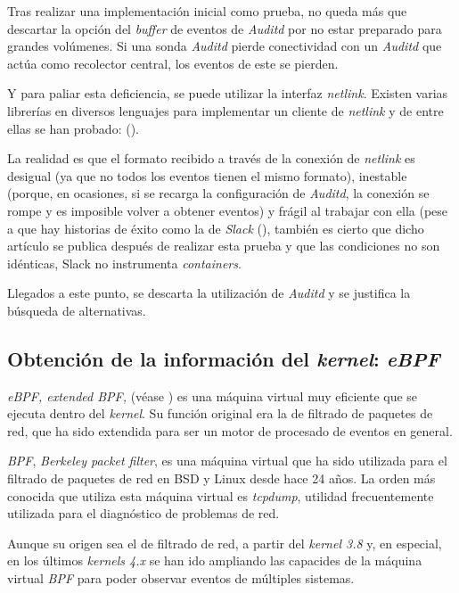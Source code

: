 Tras realizar una implementación inicial como prueba, no queda más que descartar la opción del \emph{buffer} de eventos de  \emph{Auditd} por no estar preparado para grandes volúmenes.
Si una sonda \emph{Auditd} pierde conectividad con un \emph{Auditd} que actúa como recolector central, los eventos de este se pierden.

Y para paliar esta deficiencia, se puede utilizar la interfaz \emph{netlink}. Existen varias librerías en diversos lenguajes para implementar un cliente de \emph{netlink} y de entre ellas
se han probado: (\cite{netlink-glnpy,netlink-audit-go,netlink-go-audit}).

La realidad es que el formato recibido a través de la conexión de \emph{netlink} es desigual (ya que no todos los eventos tienen el mismo formato), inestable (porque, en ocasiones, si se recarga la configuración de \emph{Auditd}, la conexión se rompe y es imposible volver a obtener eventos) y frágil al trabajar con ella (pese a que hay historias de éxito
como la de \emph{Slack} (\cite{netlink-slack-success}), también es cierto que dicho artículo se publica después de realizar esta prueba y que las condiciones no son idénticas, Slack no instrumenta \emph{containers}.

Llegados a este punto, se descarta la utilización de \emph{Auditd} y se justifica la búsqueda de alternativas.

\subsection{Obtención de la información del \emph{kernel}: \emph{eBPF}}
\label{subsec:ebpf}

\emph{eBPF, extended BPF,} (véase \cite{ebpf-brendan-gregg,ebpf-series}) es una máquina virtual muy eficiente que se ejecuta dentro del \emph{kernel}. Su función original era la de filtrado de paquetes de red, que ha sido
extendida para ser un motor de procesado de eventos en general.

\emph{BPF}, \emph{Berkeley packet filter}, es una máquina virtual que ha sido utilizada para el filtrado de paquetes de red en BSD y Linux desde hace 24 años. La orden
más conocida que utiliza esta máquina virtual es \emph{tcpdump}, utilidad frecuentemente utilizada para el diagnóstico de problemas de red.

Aunque su origen sea el de filtrado de red, a partir del \emph{kernel 3.8} y, en especial, en los últimos \emph{kernels 4.x} se han ido ampliando las capacides de la máquina virtual \emph{BPF} para poder
observar eventos de múltiples sistemas.

